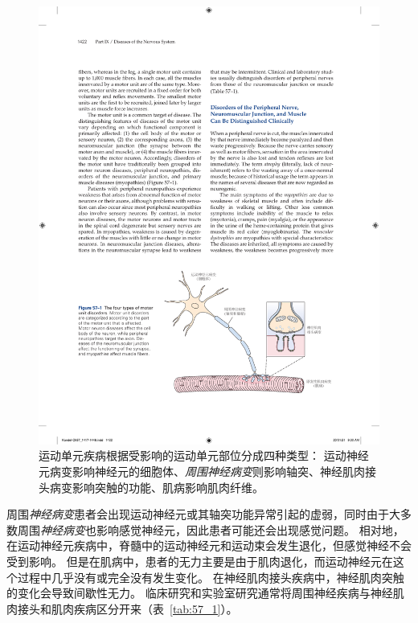 \begin{figure}[htbp]
	\centering
	\includegraphics[width=0.91\linewidth]{chap57/fig_57_1}
	\caption{运动单元疾病根据受影响的运动单元部位分成四种类型：
		运动神经元病变影响神经元的细胞体、\textit{周围神经病变}则影响轴突、神经肌肉接头病变影响突触的功能、肌病影响肌肉纤维。}
	\label{fig:57_1}
\end{figure}


周围\textit{神经病变}患者会出现运动神经元或其轴突功能异常引起的虚弱，同时由于大多数周围\textit{神经病变}也影响感觉神经元，因此患者可能还会出现感觉问题。
相对地，在运动神经元疾病中，脊髓中的运动神经元和运动束会发生退化，但感觉神经不会受到影响。
但是在肌病中，患者的无力主要是由于肌肉退化，而运动神经元在这个过程中几乎没有或完全没有发生变化。
在神经肌肉接头疾病中，神经肌肉突触的变化会导致间歇性无力。
临床研究和实验室研究通常将周围神经疾病与神经肌肉接头和肌肉疾病区分开来（表~\ref{tab:57_1}）。



